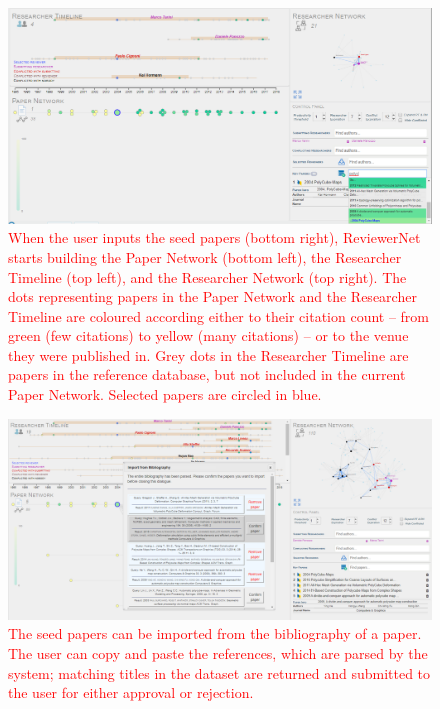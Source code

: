 \begin{figure}[!pt]
    \centering
    \includegraphics[width=\textwidth]{fig/insertion_manual.png}		
    \caption{\textcolor{red}{When the user inputs the seed papers (bottom right), ReviewerNet starts building the Paper Network (bottom left), the Researcher Timeline (top left), and the Researcher Network (top right). The dots representing papers in the Paper Network and the Researcher Timeline are coloured according \textcolor{red} {either to} their citation count -- from green (few citations) to yellow (many citations) -- \textcolor{red}{or to the venue they were published in}. Grey dots in the Researcher Timeline are papers in the reference database, but not included in the current Paper Network. Selected papers are circled in blue.}}%
    \label{fig:keypapers}
    \end{figure}
    
\begin{figure}[!p]
    \centering
    \includegraphics[width=\textwidth]{fig/insertion_biblio.png}		
    \caption{\textcolor{red}{The seed papers can be imported from the bibliography of a paper. The user can copy and paste the references, which are parsed by the system; matching titles in the dataset are returned and submitted to the user for either approval or rejection.}}%
    \label{fig:keypapers_2}
\end{figure}
    


